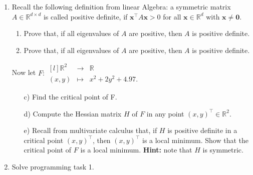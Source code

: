 \documentclass[]{scrartcl}
\newcommand{\R}{\mathbb{R}}
\newcommand{\bx}{\mathbf{x}}
\begin{document}
\begin{enumerate}
\newpage
\item Recall the following definition from linear Algebra: a symmetric matrix $A\in\R^{d\times d}$  is called positive definite, if $\bx^\top A\bx>0$ for all $\bx\in\R^d$ with $\bx\neq\mathbf{0}$.
\begin{enumerate}
    \item Prove that, if all eigenvalues of $A$ are positive, then $A$ is positive definite. 
    \item Prove that, if all eigenvalues of $A$ are positive, then $A$ is positive definite.
		\end{enumerate}
		 Now let $F:\begin{matrix*}[l]\R^2&\rightarrow&\R \\ (x,y) &\mapsto& x^2 + 2y^2  + 4.97.\end{matrix*}$ 
\begin{enumerate}
    \item[c)] Find the critical point of F.
    \item[d)] Compute the Hessian matrix $H$ of $F$ in any point $(x,y)^\top\in\R^2$. 
    \item[e)] Recall from multivariate calculus that, if $H$ is positive definite in a critical point $(x,y)^\top$, then $(x,y)^\top$ is a local minimum. Show that the critical point of $F$ is a local minimum. 
		 \textbf{Hint:} note that  $H$ is symmetric.
    \end{enumerate}

\item Solve programming task 1.
\end{enumerate}
\end{document}
